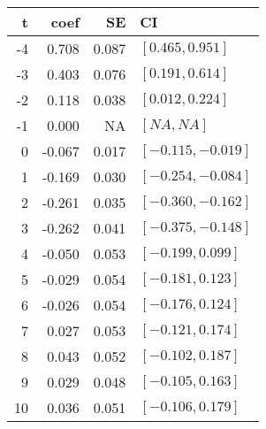 
\begin{tabular}[t]{rrrl}
\toprule
t & coef & SE & CI\\
\midrule
-4 & 0.708 & 0.087 & $[0.465 , 0.951]$\\
-3 & 0.403 & 0.076 & $[0.191 , 0.614]$\\
-2 & 0.118 & 0.038 & $[0.012 , 0.224]$\\
-1 & 0.000 & NA & $[NA , NA]$\\
0 & -0.067 & 0.017 & $[-0.115 , -0.019]$\\
1 & -0.169 & 0.030 & $[-0.254 , -0.084]$\\
2 & -0.261 & 0.035 & $[-0.360 , -0.162]$\\
3 & -0.262 & 0.041 & $[-0.375 , -0.148]$\\
4 & -0.050 & 0.053 & $[-0.199 , 0.099]$\\
5 & -0.029 & 0.054 & $[-0.181 , 0.123]$\\
6 & -0.026 & 0.054 & $[-0.176 , 0.124]$\\
7 & 0.027 & 0.053 & $[-0.121 , 0.174]$\\
8 & 0.043 & 0.052 & $[-0.102 , 0.187]$\\
9 & 0.029 & 0.048 & $[-0.105 , 0.163]$\\
10 & 0.036 & 0.051 & $[-0.106 , 0.179]$\\
\bottomrule
\end{tabular}
